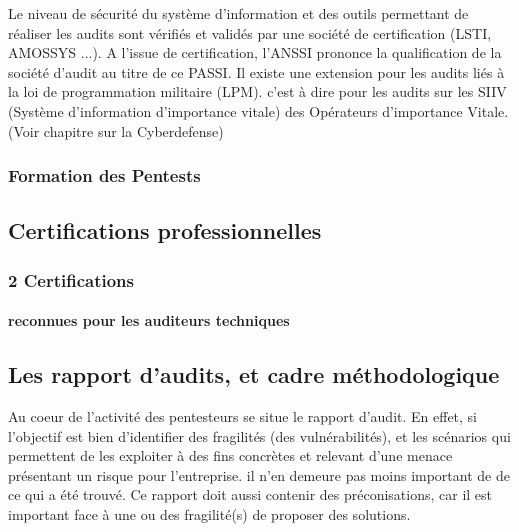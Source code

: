 Le niveau de sécurité du système d'information et des  outils permettant de réaliser les audits sont vérifiés et validés par une société de certification (LSTI, AMOSSYS ...). A l'issue de certification, l'ANSSI prononce la qualification de la société d'audit au titre de ce PASSI. Il existe une extension pour les audits liés à la loi de programmation militaire (LPM). c'est à dire pour les audits sur les SIIV (Système d'information d'importance vitale) des Opérateurs d'importance Vitale. (Voir chapitre sur la Cyberdefense)

\subsubsection{Formation des Pentests}

\subsection {Certifications professionnelles}

\begin{frame}
\frametitle<presentation>{2 Certifications}
\framesubtitle<presentation>{reconnues pour les auditeurs techniques}
\end{frame}

\subsection {Les rapport d'audits, et cadre méthodologique}

Au coeur de l'activité  des pentesteurs se situe le rapport d'audit.
En effet, si l'objectif est bien d'identifier des fragilités (des vulnérabilités), et les scénarios qui permettent de les exploiter à des fins concrètes et relevant d'une menace présentant un risque pour l'entreprise.
il n'en demeure pas moins important de  de ce qui a été trouvé. Ce rapport doit aussi contenir des préconisations, car il est important face à une ou des fragilité(s) de proposer des solutions. 




